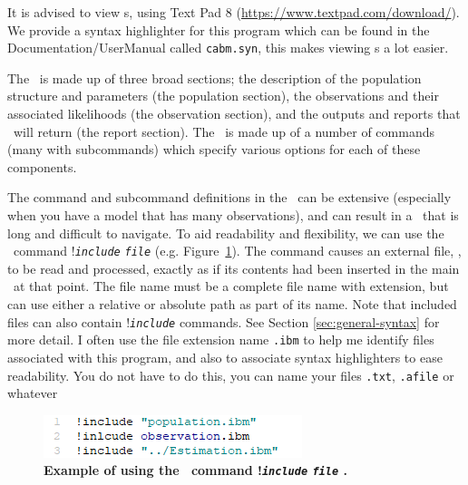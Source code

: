 It is advised to view \config s, using Text Pad 8 (\url{https://www.textpad.com/download/}). We provide a syntax highlighter for this program which can be found in the Documentation/UserManual called \texttt{cabm.syn}, this makes viewing \config s a lot easier. 


The \config\ is made up of three broad sections; the description of the population structure and parameters (the population section), the observations and their associated likelihoods (the observation section), and the outputs and reports that \IBM\ will return (the report section). The \config\ is made up of a number of commands (many with subcommands) which specify various options for each of these components.

The command and subcommand definitions in the \config\ can be extensive (especially when you have a model that has many observations), and can result in a \config\ that is long and difficult to navigate. To aid readability and flexibility, we can use the \config\ command !\texttt{\emph{include}} \texttt{\emph{file}}  (e.g. Figure~\ref{fig:config_file_1}). The command causes an external file, , to be read and processed, exactly as if its contents had been inserted in the main \config\ at that point. The file name must be a complete file name with extension, but can use either a relative or absolute path as part of its name. Note that included files can also contain !\texttt{\emph{include}} commands. See Section \ref{sec:general-syntax} for more detail. I often use the file extension name \texttt{.ibm} to help me identify files associated with this program, and also to associate syntax highlighters to ease readability. You do not have to do this, you can name your files \texttt{.txt}, \texttt{.afile} or whatever


\vspace*{3mm}
\begin{figure}[H]
	\includegraphics[scale=1]{Figures/config.png}
	\caption{\textbf{Example of using the \config\ command !\texttt{\emph{include}}
			\texttt{\emph{file}} .}}\label{fig:config_file_1}
\end{figure}

\subsection{\label{sec:redirecting-stdout}}

